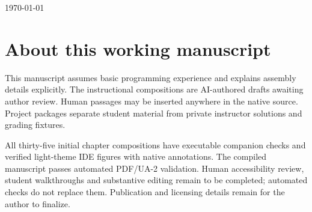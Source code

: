 \begin{titlepage}
  \centering
  \vspace*{25mm}
  {\Huge\bfseries \MARSTitle\par}
  \vspace{12mm}
  {\Large \MARSAuthor\par}
  \vspace{8mm}
  {\large \MARSEdition\par}
  \vfill
  \today
\end{titlepage}
\chapter*{About this working manuscript}
This manuscript assumes basic programming experience and explains assembly details explicitly.
The instructional compositions are AI-authored drafts awaiting author review. Human passages
may be inserted anywhere in the native source. Project packages separate student material
from private instructor solutions and grading fixtures.

All thirty-five initial chapter compositions have executable companion checks and
verified light-theme IDE figures with native annotations. The compiled manuscript
passes automated PDF/UA-2 validation. Human accessibility review, student walkthroughs
and substantive editing remain to be completed; automated checks do not replace them.
Publication and licensing details remain for the author to finalize.
  {\setlength{\parskip}{0pt}\tableofcontents}
